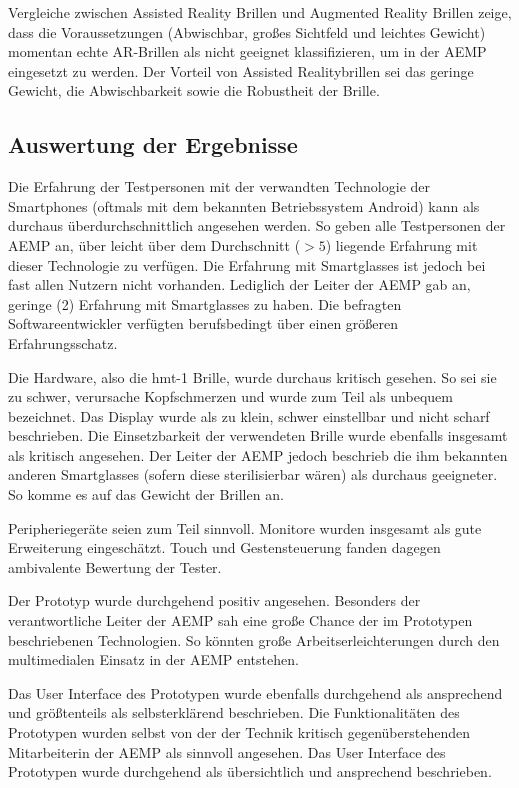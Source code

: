 Vergleiche zwischen Assisted Reality Brillen und Augmented Reality Brillen zeige, dass die Voraussetzungen (Abwischbar, großes Sichtfeld und leichtes Gewicht) momentan echte AR-Brillen als nicht geeignet klassifizieren, um in der AEMP eingesetzt zu werden. Der Vorteil von Assisted Realitybrillen sei das geringe Gewicht, die Abwischbarkeit sowie die Robustheit der Brille.
%
%
%
\subsection{Auswertung der Ergebnisse}
\label{sec:Auswertung_der_Ergebnisse}
%
%
%
Die Erfahrung der Testpersonen mit der verwandten Technologie der Smartphones (oftmals mit dem bekannten Betriebssystem Android) kann als durchaus überdurchschnittlich angesehen werden. So geben alle Testpersonen der AEMP an, über leicht über dem Durchschnitt ($>5$) liegende Erfahrung mit dieser Technologie zu verfügen. Die Erfahrung mit Smartglasses ist jedoch bei fast allen Nutzern nicht vorhanden. Lediglich der Leiter der AEMP gab an, geringe (2) Erfahrung mit Smartglasses zu haben. Die befragten Softwareentwickler verfügten berufsbedingt über einen größeren Erfahrungsschatz.

Die Hardware, also die hmt-1 Brille, wurde durchaus kritisch gesehen. So sei sie zu schwer, verursache Kopfschmerzen und wurde zum Teil als unbequem bezeichnet. Das Display wurde als zu klein, schwer einstellbar und nicht scharf beschrieben. Die Einsetzbarkeit der verwendeten Brille wurde ebenfalls insgesamt als kritisch angesehen. Der Leiter der AEMP jedoch beschrieb die ihm bekannten anderen Smartglasses (sofern diese sterilisierbar wären) als durchaus geeigneter. So komme es auf das Gewicht der Brillen an. 

Peripheriegeräte seien zum Teil sinnvoll. Monitore wurden insgesamt als gute Erweiterung eingeschätzt. Touch und Gestensteuerung fanden dagegen ambivalente Bewertung der Tester.

Der Prototyp wurde durchgehend positiv angesehen. Besonders der verantwortliche Leiter der AEMP sah eine große Chance der im Prototypen beschriebenen Technologien. So könnten große Arbeitserleichterungen durch den multimedialen Einsatz in der AEMP entstehen. 

Das User Interface des Prototypen wurde ebenfalls durchgehend als ansprechend und größtenteils als selbsterklärend beschrieben. Die Funktionalitäten des Prototypen wurden selbst von der der Technik kritisch gegenüberstehenden Mitarbeiterin der AEMP als sinnvoll angesehen. Das User Interface des Prototypen wurde durchgehend als übersichtlich und ansprechend beschrieben.

